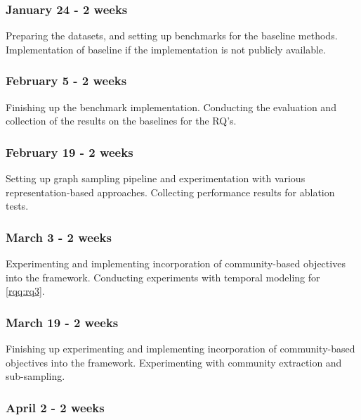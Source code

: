 \documentclass[
acmsmall,
nonacm,
screen,
acmthm]{acmart}
\begin{document}
\hypertarget{january-24---2-weeks}{%
\subsubsection{January 24 - 2 weeks}\label{january-24---2-weeks}}

Preparing the datasets, and setting up benchmarks for the baseline
methods. Implementation of baseline if the implementation is not
publicly available.

\hypertarget{february-5---2-weeks}{%
\subsubsection{February 5 - 2 weeks}\label{february-5---2-weeks}}

Finishing up the benchmark implementation. Conducting the evaluation and
collection of the results on the baselines for the RQ's.

\hypertarget{february-19---2-weeks}{%
\subsubsection{February 19 - 2 weeks}\label{february-19---2-weeks}}

Setting up graph sampling pipeline and experimentation with various
representation-based approaches. Collecting performance results for
ablation tests.

\hypertarget{march-3---2-weeks}{%
\subsubsection{March 3 - 2 weeks}\label{march-3---2-weeks}}

Experimenting and implementing incorporation of community-based
objectives into the framework. Conducting experiments with temporal
modeling for \cref{rqq:rq3}.

\hypertarget{march-19---2-weeks}{%
\subsubsection{March 19 - 2 weeks}\label{march-19---2-weeks}}

Finishing up experimenting and implementing incorporation of
community-based objectives into the framework. Experimenting with
community extraction and sub-sampling.

\hypertarget{april-2---2-weeks}{%
\subsubsection{April 2 - 2 weeks}\label{april-2---2-weeks}}
\end{document}
